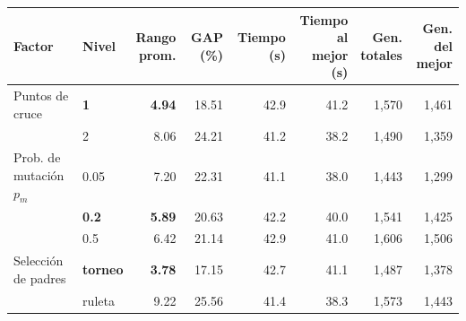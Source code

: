 \begin{tabular}{llrrrrrr}
\toprule
Factor & Nivel & \makecell{Rango\\prom.} & GAP (\%) & Tiempo (s) & \makecell{Tiempo al\\mejor (s)} & \makecell{Gen.\\totales} & \makecell{Gen. del\\mejor} \\
\midrule
Puntos de cruce & \textbf{1} & \textbf{4.94} & 18.51 & 42.9 & 41.2 & 1,570 & 1,461 \\
 & 2 & 8.06 & 24.21 & 41.2 & 38.2 & 1,490 & 1,359 \\
\addlinespace
Prob. de mutación $p_m$ & 0.05 & 7.20 & 22.31 & 41.1 & 38.0 & 1,443 & 1,299 \\
 & \textbf{0.2} & \textbf{5.89} & 20.63 & 42.2 & 40.0 & 1,541 & 1,425 \\
 & 0.5 & 6.42 & 21.14 & 42.9 & 41.0 & 1,606 & 1,506 \\
\addlinespace
Selección de padres & \textbf{torneo} & \textbf{3.78} & 17.15 & 42.7 & 41.1 & 1,487 & 1,378 \\
 & ruleta & 9.22 & 25.56 & 41.4 & 38.3 & 1,573 & 1,443 \\
\bottomrule
\end{tabular}
